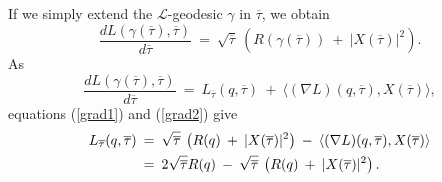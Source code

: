 If we simply extend the ${\mathcal L}$-geodesic $\gamma$
in $\overline{\tau}$, we
obtain
\begin{equation} \label{grad2}
\frac{dL(\gamma(\overline{\tau}),\overline{\tau})}{d\overline{\tau}} \: = \:
\sqrt{\overline{\tau}} \: \left( R(\gamma(\overline{\tau})) \: + \:
|X(\overline{\tau})|^2 \right).
\end{equation}
As
\begin{equation}
\frac{dL(\gamma(\overline{\tau}),\overline{\tau})}{d\overline{\tau}} \: = \:
L_{\overline{\tau}}(q, \overline{\tau}) \: + \:
\langle (\nabla L)(q, \overline{\tau}), X(\overline{\tau}) \rangle,
\end{equation}
equations (\ref{grad1}) and (\ref{grad2}) give
\begin{align} \label{timed}
L_{\overline{\tau}}(q, \overline{\tau}) \: & = \:
\sqrt{\overline{\tau}} \: \left( R(q) \: + \:
|X(\overline{\tau})|^2 \right) \: - \:
\langle (\nabla L)(q, \overline{\tau}), X(\overline{\tau}) \rangle \\
&=\:
2 \sqrt{\overline{\tau}} R(q) \:
- \: \sqrt{\overline{\tau}} \: \left( R(q) \: + \:
|X(\overline{\tau})|^2 \right). \notag
\end{align}

